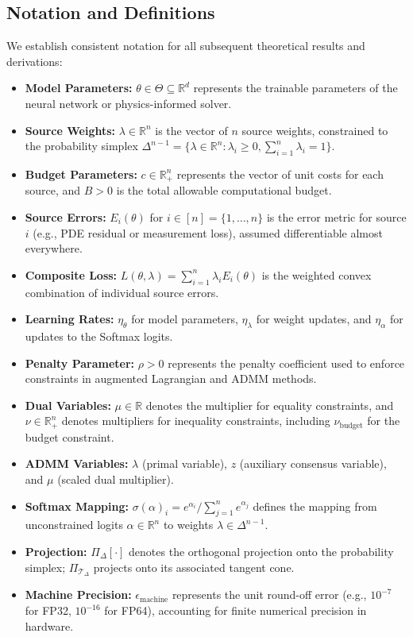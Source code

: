 \documentclass[preprint,12pt,authoryear]{elsarticle}
\begin{document}
\subsection{Notation and Definitions}

We establish consistent notation for all subsequent theoretical results and derivations:

\begin{itemize}[leftmargin=*]
    \item \textbf{Model Parameters:} $\theta \in \Theta \subseteq \mathbb{R}^d$ represents the trainable parameters of the neural network or physics-informed solver.
    \item \textbf{Source Weights:} $\lambda \in \mathbb{R}^n$ is the vector of $n$ source weights, constrained to the probability simplex $\Delta^{n-1} = \{\lambda \in \mathbb{R}^n : \lambda_i \geq 0, \sum_{i=1}^n \lambda_i = 1\}$.
    \item \textbf{Budget Parameters:} $c \in \mathbb{R}^n_+$ represents the vector of unit costs for each source, and $B > 0$ is the total allowable computational budget.
    \item \textbf{Source Errors:} $E_i(\theta)$ for $i \in [n] = \{1,\dots,n\}$ is the error metric for source $i$ (e.g., PDE residual or measurement loss), assumed differentiable almost everywhere.
    \item \textbf{Composite Loss:} $L(\theta, \lambda) = \sum_{i=1}^n \lambda_i E_i(\theta)$ is the weighted convex combination of individual source errors.
    \item \textbf{Learning Rates:} $\eta_\theta$ for model parameters, $\eta_\lambda$ for weight updates, and $\eta_\alpha$ for updates to the Softmax logits.
    \item \textbf{Penalty Parameter:} $\rho > 0$ represents the penalty coefficient used to enforce constraints in augmented Lagrangian and ADMM methods.
    \item \textbf{Dual Variables:} $\mu \in \mathbb{R}$ denotes the multiplier for equality constraints, and $\nu \in \mathbb{R}^n_+$ denotes multipliers for inequality constraints, including $\nu_{\text{budget}}$ for the budget constraint.
    \item \textbf{ADMM Variables:} $\lambda$ (primal variable), $z$ (auxiliary consensus variable), and $\mu$ (scaled dual multiplier).
    \item \textbf{Softmax Mapping:} $\sigma(\alpha)_i = e^{\alpha_i}/\sum_{j=1}^n e^{\alpha_j}$ defines the mapping from unconstrained logits $\alpha \in \mathbb{R}^n$ to weights $\lambda \in \Delta^{n-1}$.
    \item \textbf{Projection:} $\Pi_\Delta[\cdot]$ denotes the orthogonal projection onto the probability simplex; $\Pi_{\mathcal{T}_\Delta}$ projects onto its associated tangent cone.
    \item \textbf{Machine Precision:} $\epsilon_{\mathrm{machine}}$ represents the unit round-off error (e.g., $10^{-7}$ for FP32, $10^{-16}$ for FP64), accounting for finite numerical precision in hardware.
\end{itemize}
\end{document}
